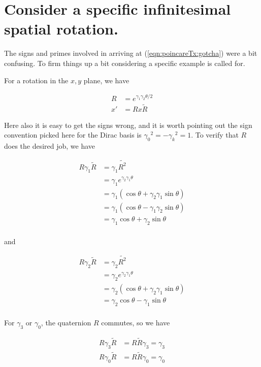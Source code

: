 \section{Consider a specific infinitesimal spatial rotation.}

The signs and primes involved in arriving at (\ref{eqn:poincareTx:gotcha}) were a bit confusing.  To firm things up a bit considering a specific example is called for.

For a rotation in the $x,y$ plane, we have

\begin{align}
R &= e^{\gamma_1 \gamma_2 \theta/2} \\
x' &= R x \tilde{R}
\end{align}

Here also it is easy to get the signs wrong, and it is worth pointing out the sign convention picked here for the Dirac basis is ${\gamma_0}^2 = -{\gamma_k}^2 = 1$.  To verify that $R$ does the desired job, we have

\begin{align*}
R \gamma_1 \tilde{R}
&=
\gamma_1 \tilde{R^2} \\
&=
\gamma_1 e^{\gamma_2 \gamma_1 \theta} \\
&=
\gamma_1 (\cos\theta + \gamma_2 \gamma_1 \sin\theta) \\
&=
\gamma_1 (\cos\theta - \gamma_1 \gamma_2 \sin\theta) \\
&=
\gamma_1 \cos\theta + \gamma_2 \sin\theta \\
\end{align*}

and 

\begin{align*}
R \gamma_2 \tilde{R}
&=
\gamma_2 \tilde{R^2} \\
&=
\gamma_2 e^{\gamma_2 \gamma_1 \theta} \\
&=
\gamma_2 (\cos\theta + \gamma_2 \gamma_1 \sin\theta) \\
&=
\gamma_2 \cos\theta - \gamma_1 \sin\theta \\
\end{align*}

For $\gamma_3$ or $\gamma_0$, the quaternion $R$ commutes, so we have

\begin{align*}
R \gamma_3 \tilde{R} &= R \tilde{R} \gamma_3 = \gamma_3 \\
R \gamma_0 \tilde{R} &= R \tilde{R} \gamma_0 = \gamma_0 \\
\end{align*}

